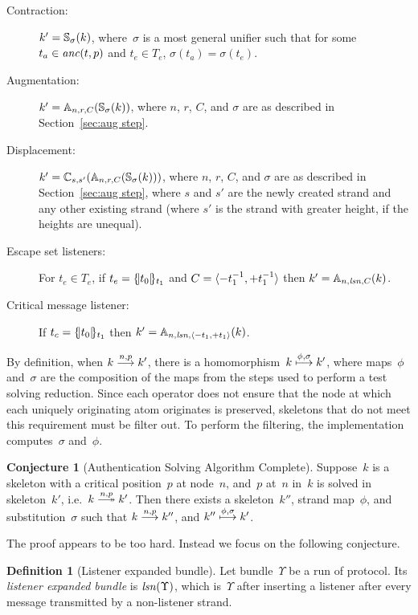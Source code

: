 \documentclass[12pt]{article}
\theoremstyle{definition}
\newtheorem{defn}{Definition}[section]
\newtheorem{conj}{Conjecture}[section]
\newcommand{\solve}[1]{\stackrel{#1}{\longtwoheadrightarrow}}
\newcommand{\anc}{\fn{anc}}
\newcommand{\lsn}{\fn{lsn}}
\begin{document}
\begin{description}
\item[Contraction:] $k'=\mathbb S_\sigma(k)$, where~$\sigma$
  is a most general unifier such that for some $t_a\in\anc(t, p)$ and
  $t_e\in T_e$, $\sigma(t_a)=\sigma(t_e)$.

\item[Augmentation:] $k'=\mathbb A_{n, r,
  C}(\mathbb S_\sigma(k))$, where $n$, $r$, $C$, and $\sigma$ are as
  described in Section~\ref{sec:aug step}.

\item[Displacement:] $k'=\mathbb C_{s,s'}(\mathbb A_{n, r,
  C}(\mathbb S_\sigma(k)))$, where $n$, $r$, $C$, and $\sigma$ are as
  described in Section~\ref{sec:aug step}, where $s$ and $s'$ are
  the newly created strand and any other existing strand (where
  $s'$ is the strand with greater height, if the heights are unequal).

\item[Escape set listeners:] For $t_e\in T_e$, if $t_e=\{\!|t_0|\!\}_{t_1}$
  and $C=\langle\mathord - t_1^{-1},\mathord + t_1^{-1}\rangle$ then
  $k'=\ops{A}_{n, \lsn,C}(k)$.

\item[Critical message listener:] If $t_c=\{\!|t_0|\!\}_{t_1}$ then
  $k'=\ops{A}_{n, \lsn,\seq{\inbnd t_1,\outbnd t_1}}(k)$.
\end{description}

By definition, when $k\stackrel{n,p}{\longrightarrow}k'$, there is a
homomorphism~$k\stackrel{\phi,\sigma}{\longmapsto}k'$, where maps~$\phi$
and~$\sigma$ are the composition of the maps from the steps used to
perform a test solving reduction.  Since each operator does not ensure
that the node at which each uniquely originating atom originates is
preserved, skeletons that do not meet this requirement must be filter
out.  To perform the filtering, the implementation computes~$\sigma$
and~$\phi$.

\begin{conj}[Authentication Solving Algorithm Complete]
Suppose~$k$ is a skeleton with a critical position~$p$ at node~$n$,
and~$p$ at~$n$ in~$k$ is solved in skeleton~$k'$, i.e.\ $k\solve{n,p}k'$.
Then there exists a skeleton~$k''$, strand map~$\phi$, and
substitution~$\sigma$ such that $k\stackrel{n,p}{\longrightarrow}k''$, and
$k''\stackrel{\phi,\sigma}{\longmapsto}k'$.
\end{conj}

The proof appears to be too hard.  Instead we focus on the following
conjecture.

\begin{defn}[Listener expanded bundle]
Let bundle~$\Upsilon$ be a run of protocol.  Its \emph{listener
  expanded bundle} is $\lsn(\Upsilon)$, which is~$\Upsilon$ after
inserting a listener after every message transmitted by a non-listener
strand.
\end{defn}
\end{document}
